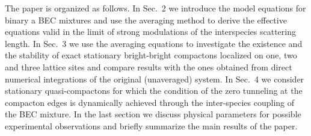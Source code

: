 \documentclass[12pt]{iopart}
\begin{document}
The paper is organized as follows. In Sec.~2 we introduce the
model equations for binary a BEC mixtures and use the averaging method
to derive the effective equations valid in the limit of strong modulations
of the interspecies scattering length. In Sec.~3 we use the averaging
equations to investigate the existence and the stability of exact stationary
bright-bright compactons localized on one, two and three
lattice sites and compare results with the ones obtained from direct
numerical integrations of the original (unaveraged) system. In Sec.~4
we consider stationary quasi-compactons for which the condition of
the zero tunneling at the compacton edges is dynamically achieved
through the inter-species coupling of the BEC mixture. In the last
section we discuss physical parameters for possible experimental observations
and briefly summarize the main results of the paper.
\end{document}
